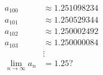 \documentclass{article}
\begin{document}
\color{white}
\pagecolor{black}

\vfill

\begin{center}
\scalebox{8}{geometry}
\end{center}

\vfill

\pagebreak

\vfill

\Huge

\begin{align*}
a_{100} &\approx 1.251098234 \\
a_{101} &\approx 1.250529344 \\
a_{102} &\approx 1.250002492 \\
a_{103} &\approx 1.250000084 \\
&\vdots \\
\lim_{n \to \infty} a_n &= 1.25?
\end{align*}

\vfill

\pagebreak
\normalsize

\vfill

\begin{center}
\end{center}

\vfill

\pagebreak
\end{document}
